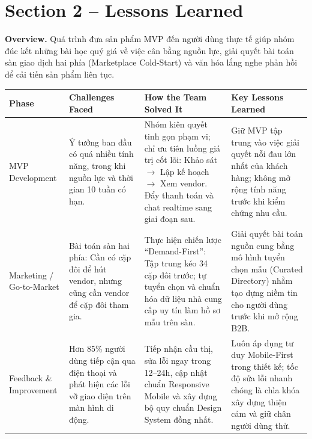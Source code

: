 \documentclass[11pt]{article}
\renewcommand{\arraystretch}{1.25}
\begin{document}
\newpage
\section*{Section 2 -- Lessons Learned}

\textbf{Overview.} Quá trình đưa sản phẩm MVP đến người dùng thực tế giúp nhóm đúc kết những bài học quý giá về việc cân bằng nguồn lực, giải quyết bài toán sàn giao dịch hai phía (Marketplace Cold-Start) và văn hóa lắng nghe phản hồi để cải tiến sản phẩm liên tục.

\begin{center}
\small
\renewcommand{\arraystretch}{1.15}
\begin{tabular}{|>{\raggedright\arraybackslash}p{}|>{\raggedright\arraybackslash}p{}|>{\raggedright\arraybackslash}p{}|>{\raggedright\arraybackslash}p{}|}
\hline
\textbf{Phase} & \textbf{Challenges Faced} & \textbf{How the Team Solved It} & \textbf{Key Lessons Learned} \\
\hline
MVP Development & Ý tưởng ban đầu có quá nhiều tính năng, trong khi nguồn lực và thời gian 10 tuần có hạn. & Nhóm kiên quyết tinh gọn phạm vi; chỉ ưu tiên luồng giá trị cốt lõi: Khảo sát $\rightarrow$ Lập kế hoạch $\rightarrow$ Xem vendor. Đẩy thanh toán và chat realtime sang giai đoạn sau. & Giữ MVP tập trung vào việc giải quyết nỗi đau lớn nhất của khách hàng; không mở rộng tính năng trước khi kiểm chứng nhu cầu. \\
\hline
Marketing / Go-to-Market & Bài toán sàn hai phía: Cần có cặp đôi để hút vendor, nhưng cũng cần vendor để cặp đôi tham gia. & Thực hiện chiến lược ``Demand-First'': Tập trung kéo 34 cặp đôi trước; tự tuyển chọn và chuẩn hóa dữ liệu nhà cung cấp uy tín làm hồ sơ mẫu trên sàn. & Giải quyết bài toán nguồn cung bằng mô hình tuyển chọn mẫu (Curated Directory) nhằm tạo dựng niềm tin cho người dùng trước khi mở rộng B2B. \\
\hline
Feedback \& Improvement & Hơn 85\% người dùng tiếp cận qua điện thoại và phát hiện các lỗi vỡ giao diện trên màn hình di động. & Tiếp nhận cầu thị, sửa lỗi ngay trong 12--24h, cập nhật chuẩn Responsive Mobile và xây dựng bộ quy chuẩn Design System đồng nhất. & Luôn áp dụng tư duy Mobile-First trong thiết kế; tốc độ sửa lỗi nhanh chóng là chìa khóa xây dựng thiện cảm và giữ chân người dùng thử. \\
\hline
\end{tabular}
\end{center}
\end{document}
